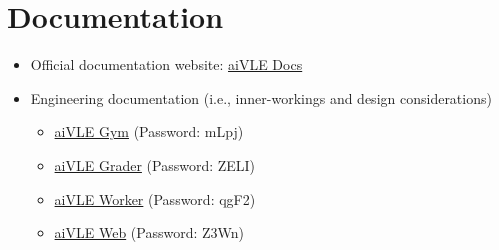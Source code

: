 \section{Documentation}
\label{as:links-documentation}
\begin{itemize}
    \item Official documentation website: \href{https://edu-ai.github.io/aivle-docs/}{aiVLE Docs}
    \item Engineering documentation (i.e., inner-workings and design considerations)
    \begin{itemize}
        \item \href{https://yuanhong.larksuite.com/docs/docusSYdnLXZBojin39b8DGzKMT}{aiVLE Gym} (Password: mLpj)
        \item \href{https://yuanhong.larksuite.com/docs/docuseeHRJWAMV3p3uL7yYCOeYx}{aiVLE Grader} (Password: ZELI)
        \item \href{https://yuanhong.larksuite.com/docs/docussD8ik4yBXShA5kPyRGhgdg}{aiVLE Worker} (Password: qgF2)
        \item \href{https://yuanhong.larksuite.com/docs/docusfWZk1oYG8qkEMG7y2oxkye}{aiVLE Web} (Password: Z3Wn)
    \end{itemize}
\end{itemize}

